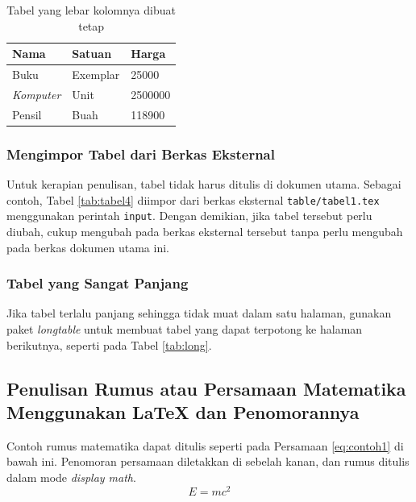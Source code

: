 \begin{table}[t] %
  \centering
  \caption{Tabel yang lebar kolomnya dibuat tetap}
  \label{tab:tabel3}
	\begin{tabular}{  p{} | p{} | p{}  }
	\hline
	\textbf{Nama} 	& \textbf{Satuan} 		& \textbf{Harga} \\
	\hline
	Buku 	& Exemplar	& 25000 \\
	\emph{Komputer}	& Unit		& 2500000 \\
	Pensil	& Buah		& 118900 \\
	\hline
	\end{tabular}
\end{table}

\subsubsection{Mengimpor Tabel dari Berkas Eksternal}

Untuk kerapian penulisan, tabel tidak harus ditulis di dokumen utama. Sebagai contoh, Tabel \ref{tab:tabel4} diimpor dari berkas eksternal \texttt{table/tabel1.tex} menggunakan perintah \texttt{input}. 
Dengan demikian, jika tabel tersebut perlu diubah, cukup mengubah pada berkas eksternal tersebut tanpa perlu mengubah pada berkas dokumen utama ini.




\subsubsection{Tabel yang Sangat Panjang}
Jika tabel terlalu panjang sehingga tidak muat dalam satu halaman, gunakan paket 
\textit{longtable} untuk membuat tabel yang dapat terpotong ke halaman berikutnya, 
seperti pada Tabel \ref{tab:long}. 



\subsection{Penulisan Rumus atau Persamaan Matematika Menggunakan {\LaTeX} dan Penomorannya}
Contoh rumus matematika dapat ditulis seperti pada Persamaan \ref{eq:contoh1} di bawah ini. 
Penomoran persamaan diletakkan di sebelah kanan, dan rumus ditulis dalam mode \textit{display math}.
\begin{equation}
E = mc^2
\label{eq:contoh1}
\end{equation}

